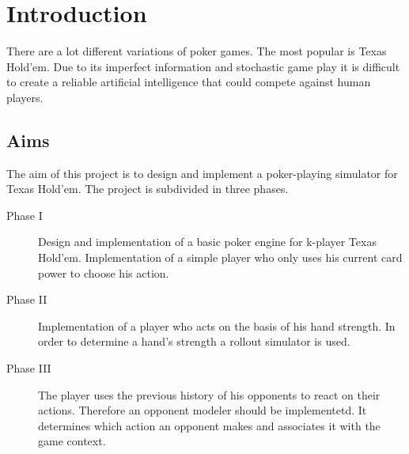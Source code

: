 \chapter{Introduction}
There are a lot different variations of poker games. The most popular is Texas Hold'em. Due to its imperfect information and stochastic game play it is difficult to create a reliable artificial intelligence that could compete against human players. 

\section{Aims}
The aim of this project is to design and implement a poker-playing simulator for Texas Hold'em. The project is subdivided in three phases.
\begin{description}
	\item[Phase I] Design and implementation of a basic poker engine for k-player Texas Hold'em. Implementation of a simple player who only uses his current card power to choose his action. 
	\item[Phase II] Implementation of a player who acts on the basis of his hand strength. In order to determine a hand's strength a rollout simulator is used.
	\item[Phase III] The player uses the previous history of his opponents to react on their actions. Therefore an opponent modeler should be implementetd.  It determines which action an opponent makes and associates it with the game context.
\end{description}

